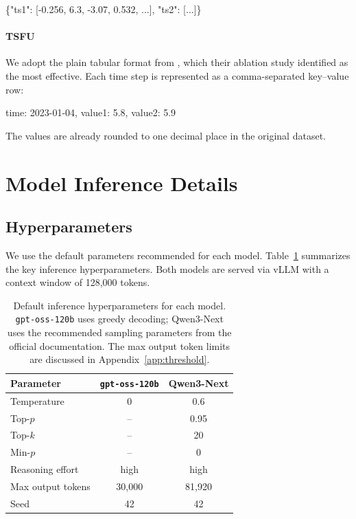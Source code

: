 \documentclass[11pt]{article}
\begin{document}
\smallskip
\begin{verbatimbox}
\{"ts1": [-0.256, 6.3, -3.07, 0.532, ...], "ts2": [...]\}
\end{verbatimbox}

\paragraph{\textsc{TSFU}} We adopt the plain tabular format from \citet{fons2024evaluatinga}, which their ablation study identified as the most effective. Each time step is represented as a comma-separated key--value row:

\smallskip
\begin{verbatimbox}
time: 2023-01-04, value1: 5.8, value2: 5.9
\end{verbatimbox}
The values are already rounded to one decimal place in the original dataset.



\section{Model Inference Details}

\subsection{Hyperparameters}

We use the default parameters recommended for each model.
Table~\ref{tab:hyperparams} summarizes the key inference hyperparameters.
Both models are served via vLLM with a context window of 128,000 tokens.

\begin{table}[h]
\centering
\small
\begin{tabular}{lcc}
\toprule
\textbf{Parameter} & \textbf{\texttt{gpt-oss-120b}} & \textbf{Qwen3-Next} \\
\midrule
Temperature        & 0     & 0.6   \\
Top-$p$            & --    & 0.95  \\
Top-$k$            & --    & 20    \\
Min-$p$            & --    & 0     \\
Reasoning effort   & high  & high  \\
Max output tokens  & 30,000 & 81,920 \\
Seed               & 42    & 42    \\
\bottomrule
\end{tabular}
\caption{Default inference hyperparameters for each model.
\texttt{gpt-oss-120b} uses greedy decoding; Qwen3-Next uses the recommended sampling parameters from the official documentation.
The max output token limits are discussed in Appendix~\ref{app:threshold}.}
\label{tab:hyperparams}
\end{table}
\end{document}
